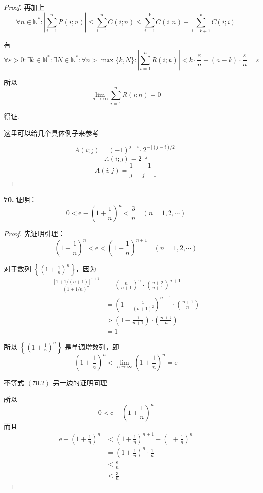 \begin{proof}
    再加上
    \[\forall n \in \mathbb{N}^*: \left|\sum_{i=1}^{n}R(i;n)\right| \leqslant \sum_{i=1}^{n} C(i;n) \leqslant \sum_{i=1}^{k} C(i;n) + \sum_{i=k+1}^{n} C(i;i) \tag{3}\]
    
    有
    \[\forall \varepsilon > 0: \exists k \in \mathbb{N}^*: \exists N \in \mathbb{N}^*: \forall n > \max\{k, N\}: \left|\sum_{i=1}^{n}R(i;n)\right| < k \cdot \frac{\varepsilon}{n} + (n-k) \cdot \frac{\varepsilon}{n} = \varepsilon\]

    所以
    \[\lim_{n \rightarrow \infty} \sum_{i=1}^{n} R(i;n) = 0\]

    得证.

    这里可以给几个具体例子来参考

    \[A(i;j) = (-1)^{j-i} \cdot 2^{-\lfloor{(j-i)/2}\rfloor}\]
    \[A(i;j) = 2^{-j}\]
    \[A(i;j) = \frac{1}{j} - \frac{1}{j+1}\]
\end{proof}\vspace{9pt}

\textbf{70.} 证明：
\[0 < \mathrm{e} - \left(1 + \frac{1}{n}\right)^n < \frac{3}{n} \quad (n = 1,2,\cdots) \tag{70.1}\]
\begin{proof}
    先证明引理：
    \[\left(1+\frac{1}{n}\right)^n < \mathrm{e} < \left(1+\frac{1}{n}\right)^{n+1} \quad (n = 1,2,\cdots) \tag{70.2}\]

    对于数列 $\displaystyle \left\{\left(1 + \frac{1}{n}\right)^n\right\}$，因为
    \begin{align*}
        \frac{[1+1/(n+1)]^{n+1}}{(1+1/n)^n} &= \left(\frac{n}{n+1}\right)^n \cdot \left(\frac{n+2}{n+1}\right)^{n+1}\\
        &= \left(1 - \frac{1}{(n+1)^2}\right)^{n+1} \cdot \left(\frac{n+1}{n}\right)\\
        &> \left(1 - \frac{1}{n+1}\right) \cdot \left(\frac{n+1}{n}\right)\\
        &= 1
    \end{align*}

    所以 $\displaystyle \left\{\left(1 + \frac{1}{n}\right)^n\right\}$ 是单调增数列，即
    \[\left(1+\frac{1}{n}\right)^n < \lim_{n \rightarrow \infty} \left(1+\frac{1}{n}\right)^n = \mathrm{e}\]

    不等式 $(70.2)$ 另一边的证明同理.

    所以
    \[0 < \mathrm{e} - \left(1 + \frac{1}{n}\right)^n \tag{70.3}\]
    而且
    \begin{align*}
        \mathrm{e} - \left(1 + \frac{1}{n}\right)^n &< \left(1 + \frac{1}{n}\right)^{n+1} - \left(1 + \frac{1}{n}\right)^n\\
        &= \left(1 + \frac{1}{n}\right)^n \cdot \frac{1}{n}\\
        &< \frac{\mathrm{e}}{n}\\
        &< \frac{3}{n} \tag{70.4}
    \end{align*}
\end{proof}\vspace{9pt}

